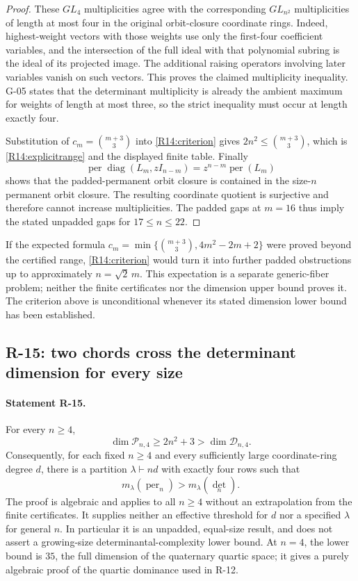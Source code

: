 \documentclass[11pt,a4paper]{article}
\theoremstyle{definition}\newtheorem{definition}{Definition}
\begin{document}
\begin{proof}
These $GL_4$ multiplicities agree with the corresponding
$GL_{n^2}$ multiplicities of length at most four in the original
orbit-closure coordinate rings. Indeed, highest-weight vectors
with those weights use only the first-four coefficient variables,
and the intersection of the full ideal with that polynomial
subring is the ideal of its projected image. The additional
raising operators involving later variables vanish on such
vectors. This proves the claimed multiplicity inequality.
G-05 states that the determinant multiplicity is already the
ambient maximum for weights of length at most three, so the
strict inequality must occur at length exactly four.

Substitution of $c_m=\binom{m+3}{3}$ into
\eqref{R14:criterion} gives $2n^2\leq\binom{m+3}{3}$, which is
\eqref{R14:explicitrange} and the displayed finite table.
Finally
\[
 \operatorname{per}\operatorname{diag}(L_m,zI_{n-m})
 =z^{n-m}\operatorname{per}(L_m)
\]
shows that the padded-permanent orbit closure is contained in
the size-$n$ permanent orbit closure. The resulting coordinate
quotient is surjective and therefore cannot increase
multiplicities. The padded gaps at $m=16$ thus imply the stated
unpadded gaps for $17\leq n\leq22$.
\end{proof}

If the expected formula
$c_m=\min\{\binom{m+3}{3},4m^2-2m+2\}$ were proved beyond the
certified range, \eqref{R14:criterion} would turn it into further
padded obstructions up to approximately $n=\sqrt2\,m$.
This expectation is a separate generic-fiber problem; neither
the finite certificates nor the dimension upper bound proves it.
The criterion above is unconditional whenever its stated
dimension lower bound has been established.

\subsection{R-15: two chords cross the determinant dimension for every size}

\paragraph{Statement R-15.}
For every $n\geq4$,
\begin{equation}\label{R15:strictdimension}
 \dim\mathcal P_{n,4}\geq2n^2+3
 >\dim\mathcal D_{n,4}.
\end{equation}
Consequently, for each fixed $n\geq4$ and every sufficiently
large coordinate-ring degree $d$, there is a partition
$\lambda\vdash nd$ with exactly four rows such that
\begin{equation}\label{R15:allngap}
 m_\lambda(\operatorname{per}_n)>m_\lambda(\det_n).
\end{equation}
The proof is algebraic and applies to all $n\geq4$ without an
extrapolation from the finite certificates. It supplies neither
an effective threshold for $d$ nor a specified $\lambda$ for
general $n$. In particular it is an unpadded, equal-size result,
and does not assert a growing-size determinantal-complexity lower
bound. At $n=4$, the lower bound is $35$, the full dimension of
the quaternary quartic space; it gives a purely algebraic proof
of the quartic dominance used in R-12.
\end{document}
